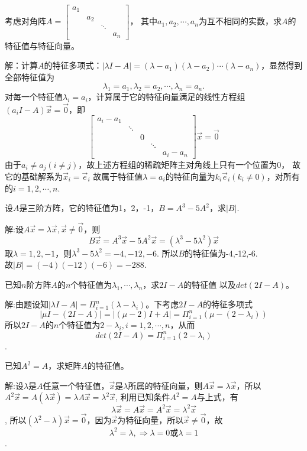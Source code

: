 \begin{eg}
考虑对角阵$A=\begin{bmatrix}a_1&&&\\&a_2&&\\&&\ddots&\\&&&a_n\end{bmatrix}$，
其中$a_1,a_2,\cdots,a_n$为互不相同的实数，求$A$的特征值与特征向量。
\end{eg}
解：计算$A$的特征多项式：$|\lambda I-A|=(\lambda-a_1)(\lambda-a_2)\cdots(\lambda-a_n)$，显然得到全部特征值为
\begin{equation*}
\lambda_1=a_1,\lambda_2=a_2,\cdots,\lambda_n=a_n.
\end{equation*}
对每一个特征值$\lambda_i=a_i$，计算属于它的特征向量满足的线性方程组
$(a_iI-A)\vec{x}=\vec{0}$，即
\begin{equation*}
\begin{bmatrix}
a_i-a_1&&&&\\
&\ddots&&&\\
&&0&&\\
&&&\ddots&\\
&&&&a_i-a_n
\end{bmatrix}
\vec{x}=\vec{0}
\end{equation*}
由于$a_i\neq a_j(i\neq j)$，故上述方程组的稀疏矩阵主对角线上只有一个位置为0，
故它的基础解系为$\vec{x}_i=\vec{e}_i$
故属于特征值$\lambda=a_i$的特征向量为$k_i\vec{e}_i(k_i\neq 0)$，对所有的$i=1,2,\cdots,n$.


\begin{eg}
设$A$是三阶方阵，它的特征值为1，2，-1，$B=A^3-5A^2$，求$|B|$.
\end{eg}
解:设$A\vec{x}=\lambda\vec{x},\vec{x}\neq\vec{0}$，则$$B\vec{x}=A^3\vec{x}-5A^2\vec{x}=(\lambda^3-5\lambda^2)\vec{x}$$
取$\lambda=1,2,-1$，则$\lambda^3-5\lambda^2=-4,-12,-6$.
所以$B$的特征值为-4,-12,-6.\\
故$|B|=(-4)(-12)(-6)=-288$.

\begin{eg}
已知$n$阶方阵$A$的$n$个特征值为$\lambda_1,\cdots,\lambda_n$，求$2I-A$的特征值
以及$det(2I-A)$。
\end{eg}
解:由题设知$|\lambda I-A|=\Pi_{i=1}^n(\lambda-\lambda_i)$。下考虑$2I-A$的特征多项式
\begin{equation*}
|\mu I-(2I-A)|=|(\mu -2)I + A|=\Pi_{i=1}^n(\mu-(2-\lambda_i))
\end{equation*}
所以$2I-A$的$n$个特征值为$2-\lambda_i,i=1,2,\cdots,n$，从而
$$det(2I-A)=\Pi_{i=1}^n(2-\lambda_i)$$.

\begin{eg}
已知$A^2=A$，求矩阵$A$的特征值。
\end{eg}
解:设$\lambda$是$A$任意一个特征值，$\vec{x}$是$\lambda$所属的特征向量，则$A\vec{x}=\lambda\vec{x}$，所以$A^2\vec{x}=A(\lambda\vec{x})=\lambda A\vec{x}=\lambda^2\vec{x}$,
利用已知条件$A^2=A$与上式，有
$$\lambda\vec{x}=A\vec{x}=A^2\vec{x}=\lambda^2\vec{x}$$,
所以$(\lambda^2-\lambda)\vec{x}=\vec{0}$，因为$\vec{x}$为特征向量，所以$\vec{x}\neq\vec{0}$，故
$$\lambda^2=\lambda,\Rightarrow\lambda =0 \text{或}\lambda=1$$.

